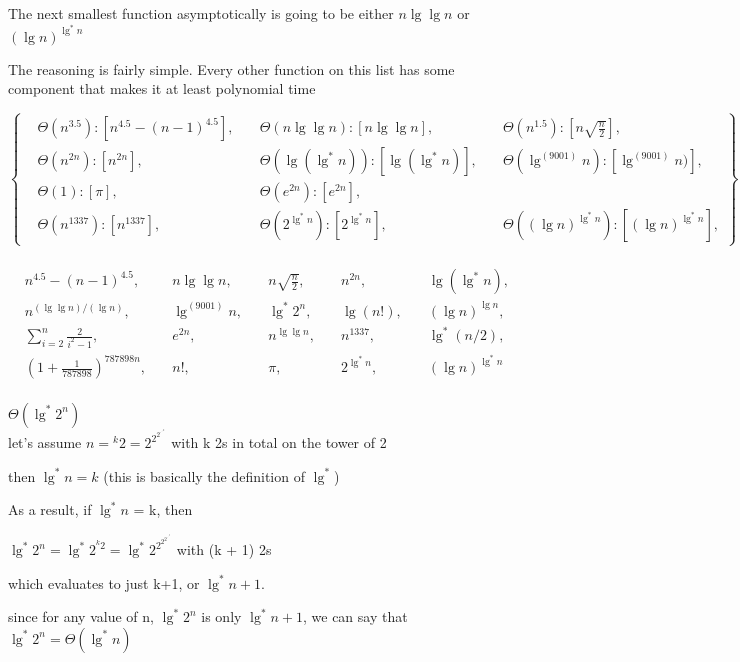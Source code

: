 \documentclass[11pt,fleqn]{article}
\theoremstyle{definition}
\theoremstyle{remark}
\begin{document}
The next smallest function asymptotically is going to be either
$n \lg \lg n$ or ${(\lg n)}^{\lg^*{n}}$

The reasoning is fairly simple. Every other function on this list 
has some component that makes it at least polynomial time

\[
\left\{
\begin{aligned}
& \Theta(n^{3.5}): [n^{4.5} - (n - 1)^{4.5}], 
& \quad \Theta(n \lg \lg n): [n \lg \lg n],
& \quad \Theta(n^{1.5}): [n\sqrt{\frac{n}{2}}],\\
& \Theta(n^{2n}): [n^{2n}],
& \quad \Theta(\lg(\lg^*n)): [\lg(\lg^*n)],
& \quad \Theta(\lg^{(9001)} n): [\lg^{(9001)} n)],\\
& \Theta(1): [\pi],
& \quad \Theta(e^{2n}): [e^{2n}],\\
& \Theta(n^{1337}): [n^{1337}],
& \quad \Theta(2^{\lg^*{n}}): [2^{\lg^*{n}}],
& \quad \Theta({(\lg n)}^{\lg^*{n}}): [{(\lg n)}^{\lg^*{n}}],
\end{aligned}
\right\}
\]\\


\[
\begin{aligned}
& n^{4.5} - (n - 1)^{4.5}, & \quad n \lg \lg n, & \quad n\sqrt{\frac{n}{2}}, & \quad n^{2n}, & \quad \lg(\lg^*n), \\
& n^{({\lg \lg n})/({\lg n})}, & \quad \lg^{(9001)} n, & \quad \lg^*2^{n}, & \quad \lg(n!), & \quad (\lg n)^{\lg n}, \\
& \sum_{i=2}^n \frac{2}{{i}^2-1}, & \quad e^{2n}, & \quad n^{\lg \lg n}, & \quad n^{1337}, & \quad \lg^*{(n/2)}, \\
& (1 + \frac{1}{787898})^{787898n}, & \quad n!, & \quad \pi, & \quad 2^{\lg^*n}, & \quad (\lg n)^{\lg^* n}
\end{aligned}
\]\\

$\Theta(\lg^*2^n)$\\
let's assume $n = {}^k 2 = 2^{2^{2^{\cdot^{\cdot^{\cdot 2}}}}}$ with k
2s in total on the tower of 2

then $\lg^*n = k$ (this is basically the definition of $\lg^*$)

As a result, if $\lg^*n$ = k, then 

$\lg^*2^n = \lg^*{2^{{}^k 2}} = \lg^*{2^{2^{2^{2^{\cdot^{\cdot^{\cdot 2}}}}}}}$ with (k + 1) 2s

which evaluates to just k+1, or $\lg^*n + 1$.

since for any value of n, $\lg^*{2^n}$ is only $\lg^*n + 1$, we can say
that $\lg^*{2^n} = \Theta(\lg^*{n})$
\end{document}
